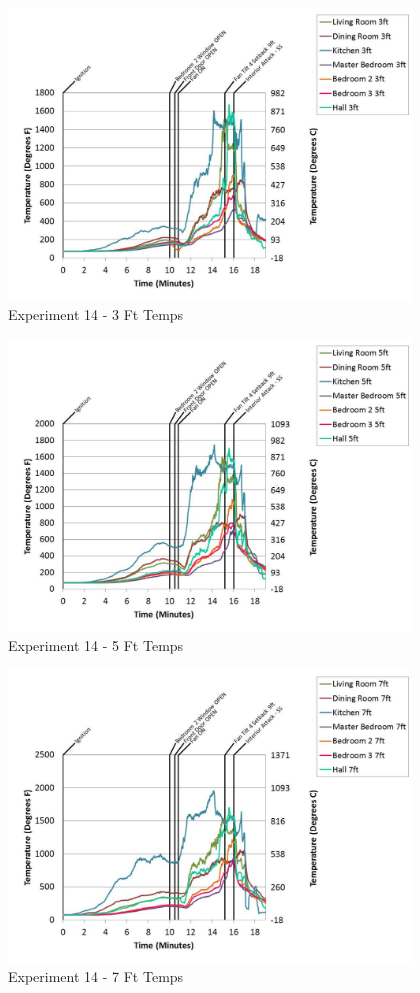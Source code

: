 \documentclass{article}
\begin{document}
\begin{appendices}
	\begin{figure}[h!]
		\centering
		\includegraphics[height=3.05in]{0_Images/Results_Charts/Exp_14_Charts/3FtTemps.pdf}
		\caption{Experiment 14 - 3 Ft Temps}
	\end{figure}
 
	\clearpage

	\begin{figure}[h!]
		\centering
		\includegraphics[height=3.05in]{0_Images/Results_Charts/Exp_14_Charts/5FtTemps.pdf}
		\caption{Experiment 14 - 5 Ft Temps}
	\end{figure}
 

	\begin{figure}[h!]
		\centering
		\includegraphics[height=3.05in]{0_Images/Results_Charts/Exp_14_Charts/7FtTemps.pdf}
		\caption{Experiment 14 - 7 Ft Temps}
	\end{figure}
 

\end{appendices}
\end{document}
